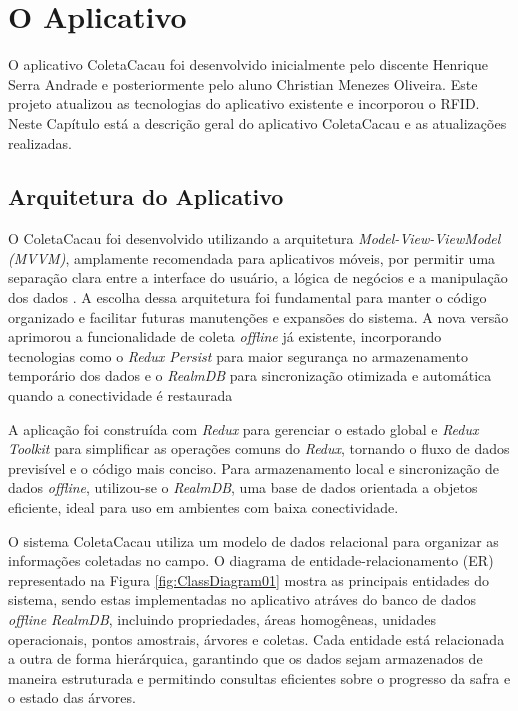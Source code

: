 \chapter{O Aplicativo}

O aplicativo ColetaCacau foi desenvolvido inicialmente pelo discente Henrique Serra Andrade e posteriormente pelo aluno Christian Menezes Oliveira. Este projeto atualizou as tecnologias do aplicativo existente e incorporou o RFID. Neste Capítulo está a descrição geral do aplicativo ColetaCacau e as atualizações realizadas.

\section{Arquitetura do Aplicativo}
O ColetaCacau foi desenvolvido utilizando a arquitetura \textit{Model-View-ViewModel (MVVM)}, amplamente recomendada para aplicativos móveis, por permitir uma separação clara entre a interface do usuário, a lógica de negócios e a manipulação dos dados \cite{Epiloksa2022EffectOM}. A escolha dessa arquitetura foi fundamental para manter o código organizado e facilitar futuras manutenções e expansões do sistema. A nova versão aprimorou a funcionalidade de coleta \textit{offline} já existente, incorporando tecnologias como o \textit{Redux Persist} para maior segurança no armazenamento temporário dos dados e o \textit{RealmDB} para sincronização otimizada e automática quando a conectividade é restaurada

A aplicação foi construída com \textit{Redux} para gerenciar o estado global e \textit{Redux Toolkit} para simplificar as operações comuns do \textit{Redux}, tornando o fluxo de dados previsível e o código mais conciso. Para armazenamento local e sincronização de dados \textit{offline}, utilizou-se o \textit{RealmDB}, uma base de dados orientada a objetos eficiente, ideal para uso em ambientes com baixa conectividade.

O sistema ColetaCacau utiliza um modelo de dados relacional para organizar as informações coletadas no campo. O diagrama de entidade-relacionamento (ER) representado na Figura \ref{fig:ClassDiagram01} mostra as principais entidades do sistema, sendo estas implementadas no aplicativo atráves do banco de dados \textit{offline} \textit{RealmDB}, incluindo propriedades, áreas homogêneas, unidades operacionais, pontos amostrais, árvores e coletas. Cada entidade está relacionada a outra de forma hierárquica, garantindo que os dados sejam armazenados de maneira estruturada e permitindo consultas eficientes sobre o progresso da safra e o estado das árvores.

